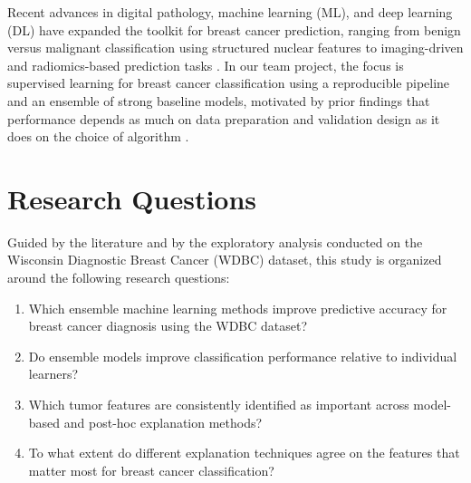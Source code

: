\documentclass[conference]{IEEEtran}
\begin{document}
Recent advances in digital pathology, machine learning (ML), and deep learning (DL) have expanded the toolkit for breast cancer prediction, ranging from benign versus malignant classification using structured nuclear features to imaging-driven and radiomics-based prediction tasks \cite{b7,b8,b9}. In our team project, the focus is supervised learning for breast cancer classification using a reproducible pipeline and an ensemble of strong baseline models, motivated by prior findings that performance depends as much on data preparation and validation design as it does on the choice of algorithm \cite{b10,b11}.

\section{Research Questions}
Guided by the literature and by the exploratory analysis conducted on the Wisconsin Diagnostic Breast Cancer (WDBC) dataset, this study is organized around the following research questions:

\begin{enumerate}[leftmargin=*, itemsep=2pt]
    \item Which ensemble machine learning methods improve predictive accuracy for breast cancer diagnosis using the WDBC dataset?
    \item Do ensemble models improve classification performance relative to individual learners?
    \item Which tumor features are consistently identified as important across model-based and post-hoc explanation methods?
    \item To what extent do different explanation techniques agree on the features that matter most for breast cancer classification?
\end{enumerate}
\end{document}
